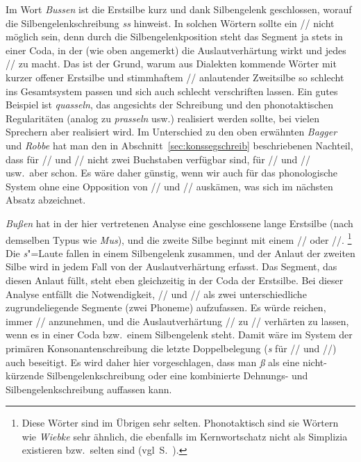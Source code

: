 Im Wort \textit{Bussen} ist die Erstsilbe kurz und dank Silbengelenk geschlossen, worauf die Silbengelenkschreibung \textit{ss} hinweist.
In solchen Wörtern sollte ein // nicht möglich sein, denn durch die Silbengelenkposition steht das Segment ja stets in einer Coda, in der (wie oben angemerkt) die Auslautverhärtung wirkt und jedes // zu \textipa{[s]} macht.
Das ist der Grund, warum aus Dialekten kommende Wörter mit kurzer offener Erstsilbe und stimmhaftem // anlautender Zweitsilbe so schlecht ins Gesamtsystem passen und sich auch schlecht verschriften lassen.
Ein gutes Beispiel ist \textit{quasseln}, das angesichts der Schreibung und den phonotaktischen Regularitäten (analog zu \textit{prasseln} usw.) \textipa{[kva:s@ln]} realisiert werden sollte, bei vielen Sprechern aber \textipa{[kvaz@ln]} realisiert wird.
Im Unterschied zu den oben erwähnten \textit{Bagger} und \textit{Robbe} hat man den in Abschnitt~\ref{sec:konssegschreib} beschriebenen Nachteil, dass für // und // nicht zwei Buchstaben verfügbar sind, für // und // usw.\ aber schon.
Es wäre daher günstig, wenn wir auch für das phonologische System ohne eine Opposition von // und // auskämen, was sich im nächsten Absatz abzeichnet.

\textit{Bußen} hat in der hier vertretenen Analyse eine geschlossene lange Erstsilbe (nach demselben Typus wie \textit{Mus}), und die zweite Silbe beginnt mit einem // oder //.%
\footnote{Diese Wörter sind im Übrigen sehr selten.
Phonotaktisch sind sie Wörtern wie \textit{Wiebke} sehr ähnlich, die ebenfalls im Kernwortschatz nicht als Simplizia existieren bzw.\ selten sind (vgl\ S.~\pageref{abs:wiebke}).}
Die \textit{s}"=Laute fallen in einem Silbengelenk zusammen, und der Anlaut der zweiten Silbe wird in jedem Fall von der Auslautverhärtung erfasst.
Das Segment, das diesen Anlaut füllt, steht eben gleichzeitig in der Coda der Erstsilbe.
Bei dieser Analyse entfällt die Notwendigkeit, // und // als zwei unterschiedliche zugrundeliegende Segmente (zwei Phoneme) aufzufassen.
Es würde reichen, immer // anzunehmen, und die Auslautverhärtung // zu // verhärten zu lassen, wenn es in einer Coda bzw.\ einem Silbengelenk steht.
Damit wäre im System der primären Konsonantenschreibung die letzte Doppelbelegung (\textit{s} für // und //) auch beseitigt.
Es wird daher hier vorgeschlagen, dass man \textit{ß} als eine nicht-kürzende Silbengelenkschreibung oder eine kombinierte Dehnungs- und Silbengelenkschreibung auffassen kann.


